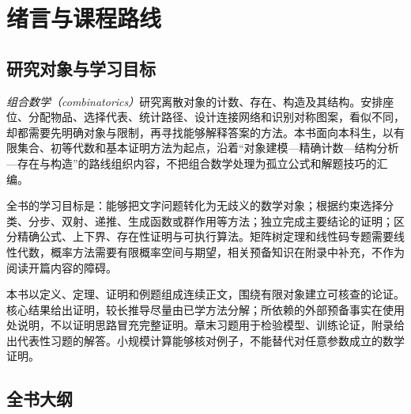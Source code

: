 \chapter{绪言与课程路线}
\label{ch:course-outline}

\section{研究对象与学习目标}

\emph{组合数学（combinatorics）}研究离散对象的计数、存在、构造及其结构。安排座位、分配物品、选择代表、统计路径、设计连接网络和识别对称图案，看似不同，却都需要先明确对象与限制，再寻找能够解释答案的方法。本书面向本科生，以有限集合、初等代数和基本证明方法为起点，沿着“对象建模---精确计数---结构分析---存在与构造”的路线组织内容，不把组合数学处理为孤立公式和解题技巧的汇编。

全书的学习目标是：能够把文字问题转化为无歧义的数学对象；根据约束选择分类、分步、双射、递推、生成函数或群作用等方法；独立完成主要结论的证明；区分精确公式、上下界、存在性证明与可执行算法。矩阵树定理和线性码专题需要线性代数，概率方法需要有限概率空间与期望，相关预备知识在附录中补充，不作为阅读开篇内容的障碍。

本书以定义、定理、证明和例题组成连续正文，围绕有限对象建立可核查的论证。核心结果给出证明，较长推导尽量由已学方法分解；所依赖的外部预备事实在使用处说明，不以证明思路冒充完整证明。章末习题用于检验模型、训练论证，附录给出代表性习题的解答。小规模计算能够核对例子，不能替代对任意参数成立的数学证明。

\section{全书大纲}

